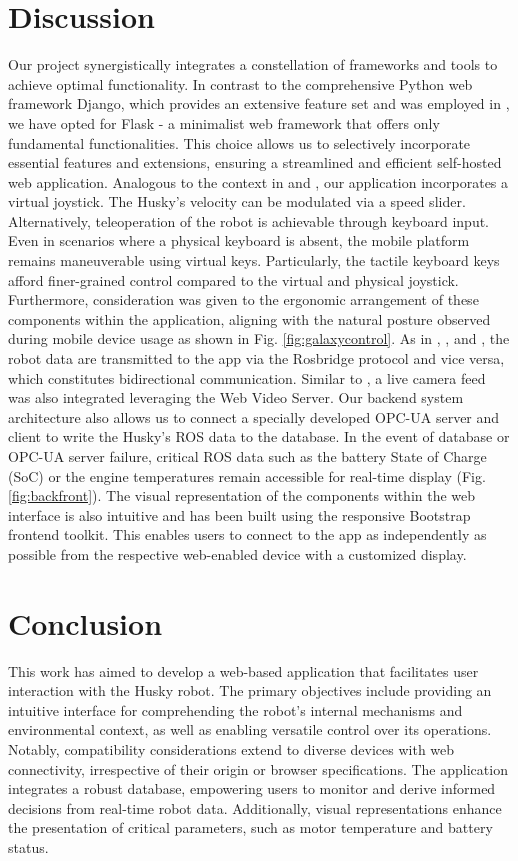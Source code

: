 \documentclass[conference]{IEEEtran}
\begin{document}
\section{Discussion}
Our project synergistically integrates a constellation of frameworks and tools to achieve optimal functionality. In contrast to the comprehensive Python web framework Django, which provides an extensive feature set \cite{django} and was employed in \cite{kapic}, we have opted for Flask - a minimalist web framework that offers only fundamental functionalities. 
This choice allows us to selectively incorporate essential features and extensions, ensuring a streamlined and efficient self-hosted web application. 
Analogous to the context in \cite{kapic} and \cite{dinodi}, our application incorporates a virtual joystick.
The Husky's velocity can be modulated via a speed slider. Alternatively, teleoperation of the robot is achievable through keyboard input. Even in scenarios where a physical keyboard is absent, the mobile platform remains maneuverable using virtual keys. Particularly, the tactile keyboard keys afford finer-grained control compared to the virtual and physical joystick. 
Furthermore, consideration was given to the ergonomic arrangement of these components within the application, aligning with the natural posture observed during mobile device usage as shown in Fig. \ref{fig:galaxycontrol}.
As in \cite{kapic}, \cite{dinodi}, \cite{johnson} and \cite{wang}, the robot data are transmitted to the app via the Rosbridge protocol and vice versa, which constitutes bidirectional communication. Similar to \cite{johnson}, a live camera feed was also integrated leveraging the Web Video Server.
Our backend system architecture also allows us to connect a specially developed OPC-UA server and client to write the Husky's ROS data to the database. In the event of database or OPC-UA server failure, critical ROS data such as the battery State of Charge (SoC) or the engine temperatures remain accessible for real-time display (Fig. \ref{fig:backfront}).
The visual representation of the components within the web interface is also intuitive and has been built using the responsive Bootstrap frontend toolkit. This enables users to connect to the app as independently as possible from the respective web-enabled device with a customized display.

\section{Conclusion}
This work has aimed to develop a web-based application that facilitates user interaction with the Husky robot. The primary objectives include providing an intuitive interface for comprehending the robot's internal mechanisms and environmental context, as well as enabling versatile control over its operations. 
Notably, compatibility considerations extend to diverse devices with web connectivity, irrespective of their origin or browser specifications. The application integrates a robust database, empowering users to monitor and derive informed decisions from real-time robot data. 
Additionally, visual representations enhance the presentation of critical parameters, such as motor temperature and battery status.
\end{document}
